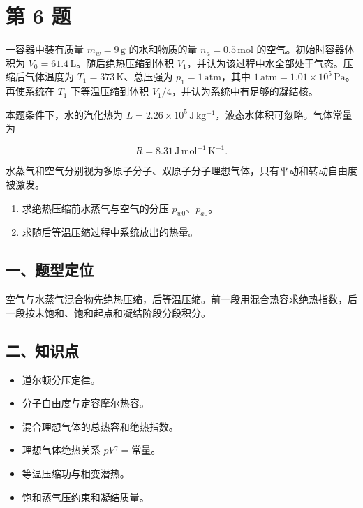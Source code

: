 \documentclass[12pt,a4paper,UTF8]{ctexart}
\newcommand{\tightlist}{\setlength{\itemsep}{0pt}\setlength{\parskip}{0pt}}
\begin{document}
\newpage

\section{第 6 题}\label{ux7b2c-6-ux9898}

一容器中装有质量 \(m_w=9\,\mathrm g\) 的水和物质的量
\(n_a=0.5\,\mathrm{mol}\) 的空气。初始时容器体积为
\(V_0=61.4\,\mathrm L\)。随后绝热压缩到体积
\(V_1\)，并认为该过程中水全部处于气态。压缩后气体温度为
\(T_1=373\,\mathrm K\)、总压强为 \(p_1=1\,\mathrm{atm}\)，其中
\(1\,\mathrm{atm}=1.01\times10^5\,\mathrm{Pa}\)。再使系统在 \(T_1\)
下等温压缩到体积 \(V_1/4\)，并认为系统中有足够的凝结核。

本题条件下，水的汽化热为
\(L=2.26\times10^5\,\mathrm{J\,kg^{-1}}\)，液态水体积可忽略。气体常量为

\[R=8.31\,\mathrm{J\,mol^{-1}\,K^{-1}}.\]

水蒸气和空气分别视为多原子分子、双原子分子理想气体，只有平动和转动自由度被激发。

\begin{enumerate}
\def\labelenumi{\arabic{enumi}.}
\tightlist
\item
  求绝热压缩前水蒸气与空气的分压 \(p_{w0}\)、\(p_{a0}\)。
\item
  求随后等温压缩过程中系统放出的热量。
\end{enumerate}

\subsection{一、题型定位}\label{ux4e00ux9898ux578bux5b9aux4f4d-5}

空气与水蒸气混合物先绝热压缩，后等温压缩。前一段用混合热容求绝热指数，后一段按未饱和、饱和起点和凝结阶段分段积分。

\subsection{二、知识点}\label{ux4e8cux77e5ux8bc6ux70b9-5}

\begin{itemize}
\tightlist
\item
  道尔顿分压定律。
\item
  分子自由度与定容摩尔热容。
\item
  混合理想气体的总热容和绝热指数。
\item
  理想气体绝热关系 \(pV^\gamma=\text{常量}\)。
\item
  等温压缩功与相变潜热。
\item
  饱和蒸气压约束和凝结质量。
\end{itemize}
\end{document}
